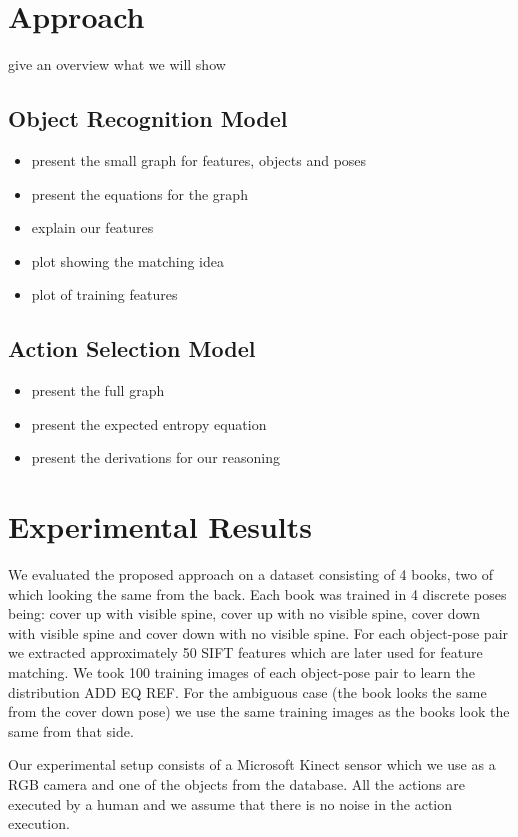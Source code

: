 \documentclass[conference]{IEEEtran}
\begin{document}
\section{Approach}
give an overview what we will show

\subsection{Object Recognition Model}
\begin{itemize}
\item present the small graph for features, objects and poses
\item present the equations for the graph
\item explain our features
\item plot showing the matching idea
\item plot of training features
\end{itemize}

\subsection{Action Selection Model}
\begin{itemize}
\item present the full graph
\item present the expected entropy equation
\item present the derivations for our reasoning
\end{itemize}

\section{Experimental Results}

We evaluated the proposed approach on a dataset consisting of 4 books, two of which looking the same from the back. Each book was trained in 4 discrete poses being: cover up with visible spine, cover up with no visible spine, cover down with visible spine and cover down with no visible spine. For each object-pose pair we extracted approximately 50 SIFT features which are later used for feature matching. We took 100 training images of each object-pose pair to learn the distribution ADD EQ REF. For the ambiguous case (the book looks the same from the cover down pose) we use the same training images as the books look the same from that side.

Our experimental setup consists of a Microsoft Kinect sensor which we use as a RGB camera and one of the objects from the database. All the actions are executed by a human and we assume that there is no noise in the action execution. 
\end{document}
